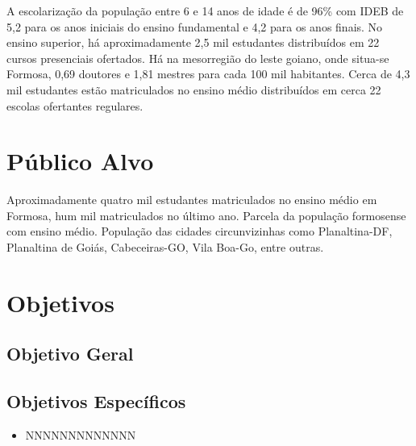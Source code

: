 \documentclass[11pt,fleqn]{book} %
\begin{document}
A escolarização da população entre 6 e 14 anos de idade é de 96\% com IDEB de 5,2 para os anos iniciais do ensino fundamental e 4,2 para os anos finais. 
No ensino superior, há aproximadamente 2,5 mil estudantes distribuídos em 22 cursos presenciais ofertados. 
Há na mesorregião do leste goiano, onde situa-se Formosa, 0,69 doutores e 1,81 mestres para cada 100 mil habitantes.
Cerca de 4,3 mil estudantes estão matriculados no ensino médio distribuídos em cerca 22 escolas ofertantes regulares. 

\section{Público Alvo}

Aproximadamente quatro mil estudantes matriculados no ensino médio em Formosa, hum mil matriculados no último ano.
Parcela da população formosense com ensino médio.
População das cidades circunvizinhas como Planaltina-DF, Planaltina de Goiás, Cabeceiras-GO, Vila Boa-Go, entre outras.


\section{Objetivos}\label{objetivos}

\subsection{Objetivo Geral}


\subsection{Objetivos Específicos}

\begin{itemize}
\item NNNNNNNNNNNNN 
\end{itemize}
\end{document}
